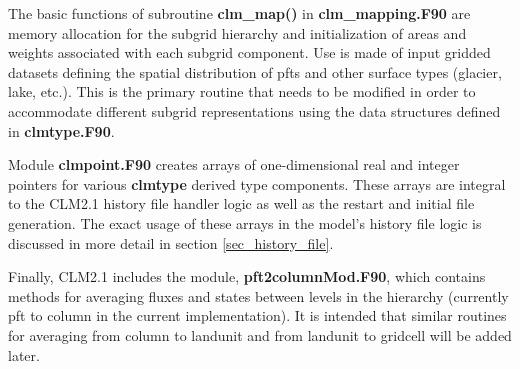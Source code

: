 The basic functions of subroutine {\bf clm\_map()} in {\bf
clm\_mapping.F90} are memory allocation for the subgrid hierarchy and
initialization of areas and weights associated with each subgrid
component. Use is made of input gridded datasets defining the spatial
distribution of pfts and other surface types (glacier, lake, etc.).
This is the primary routine that needs to be modified in order to
accommodate different subgrid representations using the data
structures defined in {\bf clmtype.F90}.

Module {\bf clmpoint.F90} creates arrays of one-dimensional real and
integer pointers for various {\bf clmtype} derived type
components. These arrays are integral to the CLM2.1 history file
handler logic as well as the restart and initial file generation. The
exact usage of these arrays in the model's history file logic is
discussed in more detail in section \ref{sec_history_file}.

Finally, CLM2.1 includes the module, {\bf pft2columnMod.F90}, which
contains methods for averaging fluxes and states between levels in the
hierarchy (currently pft to column in the current implementation).  It
is intended that similar routines for averaging from column to
landunit and from landunit to gridcell will be added later.
